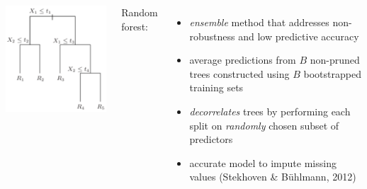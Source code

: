 \documentclass[20pt,margin=1in,innermargin=-4.5in,blockverticalspace=-0.25in]{tikzposter}
\begin{document}
\begin{columns}
{        \vspace{-1.5em}

        \begin{center}
            \begin{tikzfigure}[]
                \includegraphics[scale=1.9]{tree.png}
             \end{tikzfigure}
        \end{center}

        \vspace{-3em}
        
        Random forest:
        \vspace{-0.5em}
        \begin{itemize}
            \item \textit{ensemble} method that addresses non-robustness and low predictive accuracy
            \vspace{-0.5em}
            \item average predictions from $B$ non-pruned trees constructed using $B$ bootstrapped training sets 
            \vspace{-0.5em}
            \item \textit{decorrelates} trees by performing each split on \textit{randomly} chosen subset of predictors
            \vspace{-0.5em}
            \item accurate model to impute missing values (Stekhoven \& Bühlmann, 2012)
            \vspace{-1em}
        \end{itemize} 
    }


\end{columns}
\end{document}
